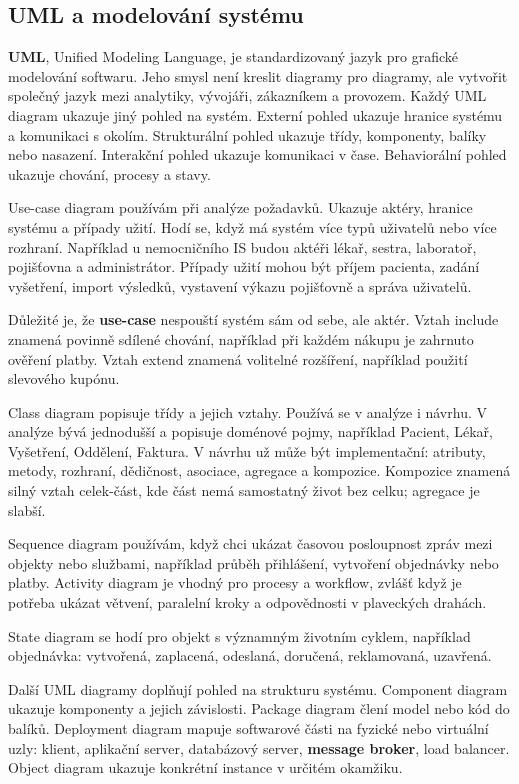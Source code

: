 \documentclass[11pt,a4paper]{article}
\begin{document}
\subsection*{UML a modelování systému}

\textbf{UML}, Unified Modeling Language, je standardizovaný jazyk pro grafické modelování softwaru. Jeho smysl není kreslit diagramy pro diagramy, ale vytvořit společný jazyk mezi analytiky, vývojáři, zákazníkem a provozem. Každý UML diagram ukazuje jiný pohled na systém. Externí pohled ukazuje hranice systému a komunikaci s okolím. Strukturální pohled ukazuje třídy, komponenty, balíky nebo nasazení. Interakční pohled ukazuje komunikaci v čase. Behaviorální pohled ukazuje chování, procesy a stavy.

Use-case diagram používám při analýze požadavků. Ukazuje aktéry, hranice systému a případy užití. Hodí se, když má systém více typů uživatelů nebo více rozhraní. Například u nemocničního IS budou aktéři lékař, sestra, laboratoř, pojišťovna a administrátor. Případy užití mohou být příjem pacienta, zadání vyšetření, import výsledků, vystavení výkazu pojišťovně a správa uživatelů.

Důležité je, že \textbf{use-case} nespouští systém sám od sebe, ale aktér. Vztah include znamená povinně sdílené chování, například při každém nákupu je zahrnuto ověření platby. Vztah extend znamená volitelné rozšíření, například použití slevového kupónu.

Class diagram popisuje třídy a jejich vztahy. Používá se v analýze i návrhu. V analýze bývá jednodušší a popisuje doménové pojmy, například Pacient, Lékař, Vyšetření, Oddělení, Faktura. V návrhu už může být implementační: atributy, metody, rozhraní, dědičnost, asociace, agregace a kompozice. Kompozice znamená silný vztah celek-část, kde část nemá samostatný život bez celku; agregace je slabší.

Sequence diagram používám, když chci ukázat časovou posloupnost zpráv mezi objekty nebo službami, například průběh přihlášení, vytvoření objednávky nebo platby. Activity diagram je vhodný pro procesy a workflow, zvlášť když je potřeba ukázat větvení, paralelní kroky a odpovědnosti v plaveckých drahách.

State diagram se hodí pro objekt s významným životním cyklem, například objednávka: vytvořená, zaplacená, odeslaná, doručená, reklamovaná, uzavřená.

Další UML diagramy doplňují pohled na strukturu systému. Component diagram ukazuje komponenty a jejich závislosti. Package diagram člení model nebo kód do balíků. Deployment diagram mapuje softwarové části na fyzické nebo virtuální uzly: klient, aplikační server, databázový server, \textbf{message broker}, load balancer. Object diagram ukazuje konkrétní instance v určitém okamžiku.
\end{document}
